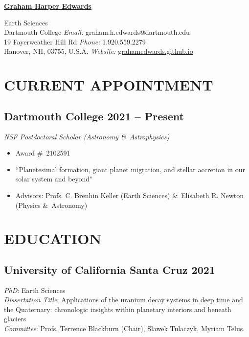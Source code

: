 \documentclass[10pt]{article}
\begin{document}

\begingroup
\centering \LARGE \textbf{\underline{Graham Harper Edwards}} \\ [1em]
\endgroup



Earth Sciences \\
Dartmouth College \hfill \textit{Email:} graham.h.edwards@dartmouth.edu \\
19 Fayerweather Hill Rd \hfill \textit{Phone:} 1.920.559.2279 \\
Hanover, NH, 03755, U.S.A.	\hfill \textit{Website:} \href{https://grahamedwards.github.io}{grahamedwards.github.io}

\vspace{2ex}


\section*{CURRENT APPOINTMENT}
\subsection*{\textbf{Dartmouth College} \hfill 2021 – Present}
\textit{NSF Postdoctoral Scholar (Astronomy \&\ Astrophysics)}
\begin{itemize}
	\item[] Award \#\ 2102591
	\item[] ``Planetesimal formation, giant planet migration, and stellar accretion in our solar system and beyond"
	\item[] Advisors: Profs. C. Brenhin Keller (Earth Sciences) \&\ Elisabeth R. Newton (Physics \&\ Astronomy)
\end{itemize}


\section*{EDUCATION}

\subsection*{\textbf{University of California Santa Cruz} \hfill 2021}
\textit{PhD}: Earth Sciences\\
\textit{Dissertation Title}: Applications of the uranium decay systems in deep time and the Quaternary: chronologic insights within planetary interiors and beneath glaciers\\
\textit{Committee}: Profs. Terrence Blackburn (Chair), Slawek Tulaczyk, Myriam Telus.
\end{document}
